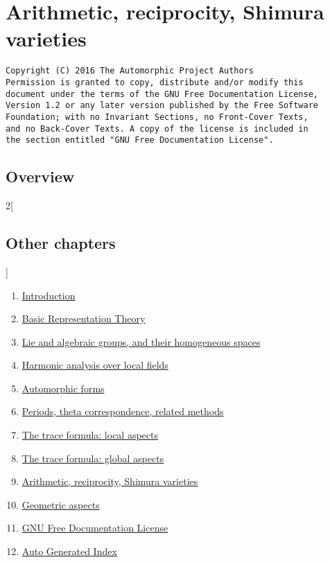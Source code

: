 \documentclass{stacks-project-book}
\theoremstyle{plain}
\theoremstyle{definition}
\theoremstyle{remark}
\numberwithin{equation}{subsection}
\begin{document}
%

\chapter{Arithmetic, reciprocity, Shimura varieties}



\label{arithmetic-section-phantom}

\begin{verbatim}
Copyright (C) 2016 The Automorphic Project Authors
Permission is granted to copy, distribute and/or modify this
document under the terms of the GNU Free Documentation License,
Version 1.2 or any later version published by the Free Software
Foundation; with no Invariant Sections, no Front-Cover Texts,
and no Back-Cover Texts. A copy of the license is included in
the section entitled "GNU Free Documentation License".
\end{verbatim}



\section{Overview}
\label{arithmetic-section-overview}



\begin{multicols}{2}[\section{Other chapters}]
\noindent
\begin{enumerate}
\item \hyperref[introduction-section-phantom]{Introduction}
\item \hyperref[representationtheory-section-phantom]{Basic Representation Theory}
\item \hyperref[algebraicgroups-section-phantom]{Lie and algebraic groups, and their homogeneous spaces}
\item \hyperref[harmonicanalysis-section-phantom]{Harmonic analysis over local fields}
\item \hyperref[automorphicforms-section-phantom]{Automorphic forms}
\item \hyperref[periods-section-phantom]{Periods, theta correspondence, related methods}
\item \hyperref[traceformulalocal-section-phantom]{The trace formula: local aspects}
\item \hyperref[traceformulaglobal-section-phantom]{The trace formula: global aspects}
\item \hyperref[arithmetic-section-phantom]{Arithmetic, reciprocity, Shimura varieties}
\item \hyperref[geometric-section-phantom]{Geometric aspects}
\item \hyperref[fdl-section-phantom]{GNU Free Documentation License}
\item \hyperref[index-section-phantom]{Auto Generated Index}
\end{enumerate}
\end{multicols}
\end{document}
